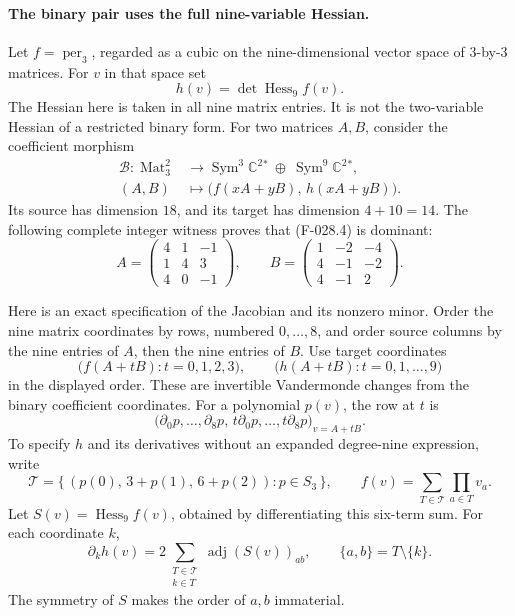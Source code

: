 \paragraph{The binary pair uses the full nine-variable Hessian.}
Let \(f=\operatorname{per}_3\), regarded as a cubic on
the nine-dimensional vector space of \(3\)-by-\(3\) matrices.
For \(v\) in that space set
\[
                     h(v)=\det\operatorname{Hess}_9 f(v).
                                                               \tag{F-028.3}
\]
The Hessian here is taken in all nine matrix entries.
It is not the two-variable Hessian of a restricted binary form.
For two matrices \(A,B\), consider the coefficient morphism
\[
 \begin{split}
 \mathcal B:\operatorname{Mat}_3^2
       &\longrightarrow
            \operatorname{Sym}^3\mathbb C^2{}^*
                  \ \oplus\ \operatorname{Sym}^9\mathbb C^2{}^*,\\
 (A,B)&\longmapsto
      \bigl(f(xA+yB),\,h(xA+yB)\bigr).
 \end{split}                                                   \tag{F-028.4}
\]
Its source has dimension \(18\), and its target has
dimension \(4+10=14\).
The following complete integer witness proves that
(F-028.4) is dominant:
\[
 A=\begin{pmatrix}4&1&-1\\1&4&3\\4&0&-1\end{pmatrix},
 \qquad
 B=\begin{pmatrix}1&-2&-4\\4&-1&-2\\4&-1&2\end{pmatrix}.
                                                               \tag{F-028.5}
\]

Here is an exact specification of the Jacobian and its
nonzero minor. Order the nine matrix coordinates by rows,
numbered \(0,\ldots,8\), and order source columns by
the nine entries of \(A\), then the nine entries of \(B\).
Use target coordinates
\[
 \bigl(f(A+tB):t=0,1,2,3\bigr),\qquad
 \bigl(h(A+tB):t=0,1,\ldots,9\bigr)
                                                               \tag{F-028.6}
\]
in the displayed order. These are invertible Vandermonde
changes from the binary coefficient coordinates.
For a polynomial \(p(v)\), the row at \(t\) is
\[
     \bigl(\partial_0p,\ldots,\partial_8p,\,
            t\partial_0p,\ldots,t\partial_8p\bigr)_{v=A+tB}.
                                                               \tag{F-028.7}
\]
To specify \(h\) and its derivatives without an expanded
degree-nine expression, write
\[
 \mathcal T=
   \{\,(p(0),\,3+p(1),\,6+p(2)):p\in S_3\,\},
 \qquad f(v)=\sum_{T\in\mathcal T}\prod_{a\in T}v_a .
\]
Let \(S(v)=\operatorname{Hess}_9 f(v)\), obtained by
differentiating this six-term sum. For each coordinate \(k\),
\[
 \partial_k h(v)=
       2\sum_{\substack{T\in\mathcal T\\k\in T}}
              \operatorname{adj}(S(v))_{ab},
                  \qquad \{a,b\}=T\setminus\{k\}.
                                                               \tag{F-028.8}
\]
The symmetry of \(S\) makes the order of \(a,b\) immaterial.

